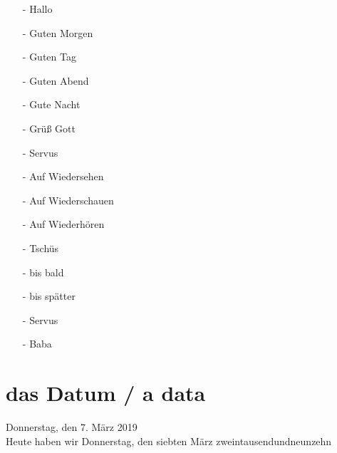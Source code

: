         \begin{multicols}{2}
            \begin{itemize}[topsep=0pt,itemsep=4pt,parsep=0pt]
                \item[-] Hallo 
                \item[-] Guten Morgen 
                \item[-] Guten Tag 
                \item[-] Guten Abend 
                \item[-] Gute Nacht 
                \item[-] Grüß Gott 
                \item[-] Servus  
            \end{itemize}
        \vfill\null
        \columnbreak
            \begin{itemize}[topsep=0pt,itemsep=4pt,parsep=0pt]
                \item[-] Auf Wiedersehen 
                \item[-] Auf Wiederschauen 
                \item[-] Auf Wiederhören 
                \item[-] Tschüs 
                \item[-] bis bald 
                \item[-] bis spätter 
                \item[-] Servus 
                \item[-] Baba   
            \end{itemize}
        \end{multicols}

    \section{das Datum / a data}\label{section:deutsch:dasdatum}

        Donnerstag, den 7. März 2019\\
        Heute haben wir Donnerstag, den siebten März zweintausendundneunzehn\\

